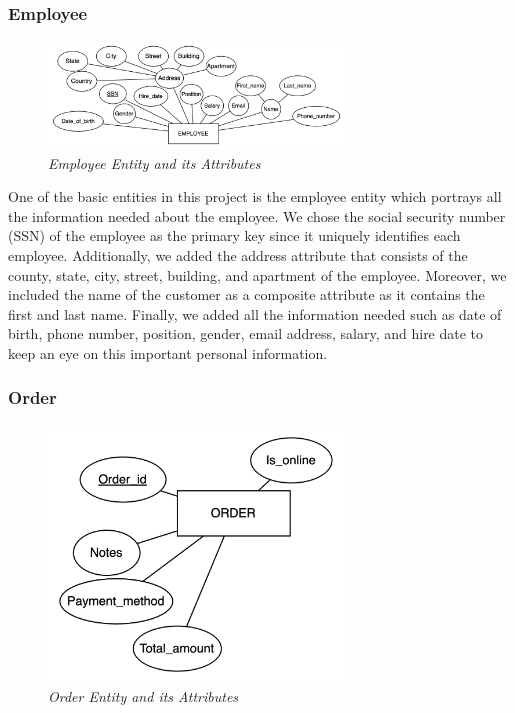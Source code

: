 \subsubsection{Employee}
\begin{figure}[H]
  \centering
  \includegraphics[width=0.7\textwidth]{images/entities/employee.png}
  \caption{\textit{Employee Entity and its Attributes}}
\end{figure}

One of the basic entities in this project is the employee entity which portrays all the information needed about the employee. We chose the social security number (SSN) of the employee as the primary key since it uniquely identifies each employee. Additionally, we added the address attribute that consists of the county, state, city, street, building, and apartment of the employee. Moreover, we included the name of the customer as a composite attribute as it contains the first and last name. Finally, we added all the information needed such as date of birth, phone number, position, gender, email address, salary, and hire date to keep an eye on this important personal information.

\subsubsection{Order}
\begin{figure}[H]
  \centering
  \includegraphics[width=0.7\textwidth]{images/entities/order.png}
  \caption{\textit{Order Entity and its Attributes}}
\end{figure}

